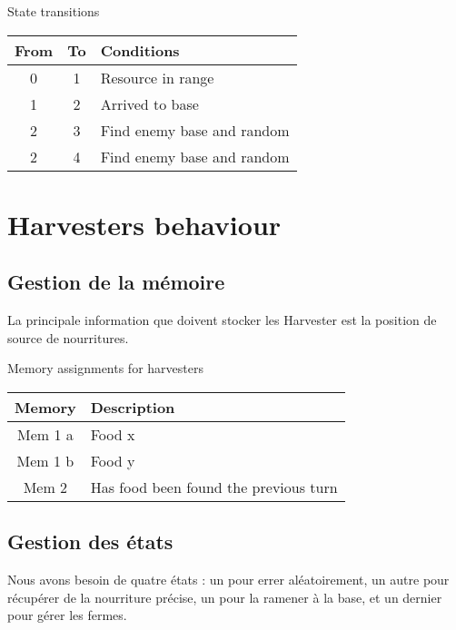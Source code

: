\documentclass{article}
\begin{document}
\begin{table}[ht]
	State transitions\\
	\begin{tabular}{|c|c|l|}
		\hline
		From & To & Conditions\\
		\hline
		0 & 1 & Resource in range\\
		\hline
		1 & 2 & Arrived to base\\
		\hline
		2 & 3 & Find enemy base and random\\
		\hline
		2 & 4 & Find enemy base and random\\
		\hline
	\end{tabular}
\end{table}

\section{Harvesters behaviour}


\subsection{Gestion de la mémoire}

La principale information que doivent stocker les Harvester est la position de source de nourritures.
\newline

\begin{table}[ht]
	Memory assignments for harvesters\\
	\begin{tabular}{|c|l|}
		\hline
		Memory & Description\\
		\hline
		Mem 1 a & Food x\\
		Mem 1 b & Food y\\
		\hline
                Mem 2 & Has food been found the previous turn\\
                \hline
	\end{tabular}
\end{table}

\subsection{Gestion des états}

Nous avons besoin de quatre états : un pour errer aléatoirement, un autre pour récupérer de la nourriture précise, un pour la ramener à la base, et un dernier pour gérer les fermes.
\end{document}
